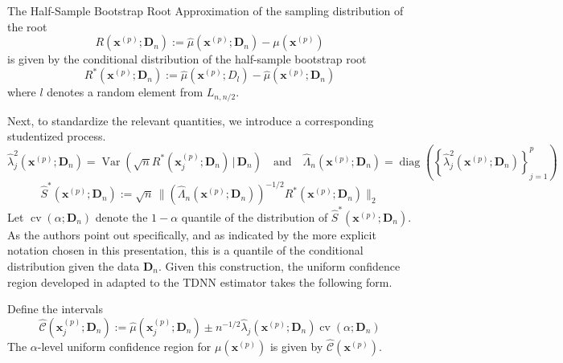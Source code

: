 \documentclass[letterpaper,10pt]{article}
\numberwithin{equation}{section}
\numberwithin{theorem}{section}
\numberwithin{remark}{section}
\numberwithin{example}{section}
\theoremstyle{definition}
\renewcommand{\hat}{\widehat}
\newcommand{\1}{\mathbb{1}}
\begin{document}
\vspace{0.5cm}
\begin{definition}
	The Half-Sample Bootstrap Root Approximation of the sampling distribution of the root
	\begin{equation}
		R\left(\mathbf{x}^{(p)}; \mathbf{D}_n\right)
		:= \hat{\mu}\left(\mathbf{x}^{(p)}; \mathbf{D}_n\right) - \mu(\mathbf{x}^{(p)})
	\end{equation}
	is given by the conditional distribution of the half-sample bootstrap root
	\begin{equation}
		R^{*}\left(\mathbf{x}^{(p)}; \mathbf{D}_n\right)
		:= \hat{\mu}\left(\mathbf{x}^{(p)}; D_l\right) - \hat{\mu}\left(\mathbf{x}^{(p)}; \mathbf{D}_n\right)
	\end{equation}
	where $l$ denotes a random element from $L_{n, n/2}$.
\end{definition}
Next, to standardize the relevant quantities, we introduce a corresponding studentized process.
\begin{equation}
	\hat{\lambda}_{j}^{2}\left(\mathbf{x}^{(p)}; \mathbf{D}_n\right) = \operatorname{Var}\left(\sqrt{n} R^{*}(\mathbf{x}^{(p)}_{j}; \mathbf{D}_n) \, | \, \mathbf{D}_n\right)
	\quad \text{and} \quad
	\hat{\Lambda}_n\left(\mathbf{x}^{(p)}; \mathbf{D}_n\right) = \operatorname{diag}\left(\left\{\hat{\lambda}_{j}^{2}\left(\mathbf{x}^{(p)}; \mathbf{D}_n\right)\right\}_{j = 1}^{p}\right)
\end{equation}
\begin{equation}
	\hat{S}^{*}\left(\mathbf{x}^{(p)}; \mathbf{D}_n\right)
	:= \sqrt{n} \, \Big\| \left(\hat{\Lambda}_n\left(\mathbf{x}^{(p)}; \mathbf{D}_n\right)\right)^{-1/2} R^{*}\left(\mathbf{x}^{(p)}; \mathbf{D}_n\right)\Big\|_{2}
\end{equation}
Let $\operatorname{cv}\left(\alpha; \mathbf{D}_n\right)$ denote the $1-\alpha$ quantile of the distribution of $\hat{S}^{*}\left(\mathbf{x}^{(p)}; \mathbf{D}_n\right)$.
As the authors point out specifically, and as indicated by the more explicit notation chosen in this presentation, this is a quantile of the conditional distribution given the data $\mathbf{D}_n$.
Given this construction, the uniform confidence region developed in \citet{ritzwoller_uniform_2024} adapted to the TDNN estimator takes the following form.

\vspace{0.5cm}
\begin{theorem}
	Define the intervals
	\begin{equation}
		\hat{\mathcal{C}}\left(\mathbf{x}^{(p)}_j; \mathbf{D}_n\right)
		:= \hat{\mu}\left(\mathbf{x}^{(p)}_{j}; \mathbf{D}_n\right) \pm
		n^{-1/2} \hat{\lambda}_{j}\left(\mathbf{x}^{(p)}; \mathbf{D}_n\right)\operatorname{cv}\left(\alpha; \mathbf{D}_n\right)
	\end{equation}
	The $\alpha$-level uniform confidence region for $\mu\left(\mathbf{x}^{(p)}\right)$ is given by $\hat{\mathcal{C}}\left(\mathbf{x}^{(p)}\right)$.
\end{theorem}
\end{document}
